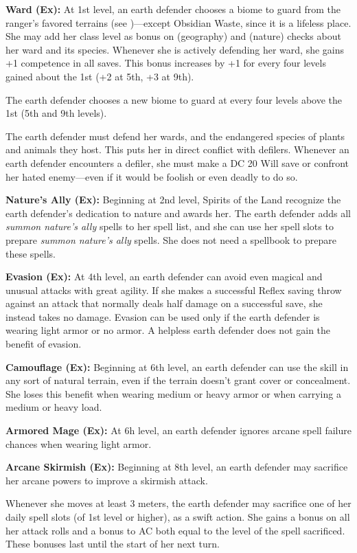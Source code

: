 {\textbf{Ward (Ex):} At 1st level, an earth defender chooses a biome to guard from the ranger's favored terrains (see )---except Obsidian Waste, since it is a lifeless place. She may add her class level as bonus on  (geography) and  (nature) checks about her ward and its species. Whenever she is actively defending her ward, she gains +1 competence in all saves. This bonus increases by +1 for every four levels gained about the 1st (+2 at 5th, +3 at 9th).

The earth defender chooses a new biome to guard at every four levels above the 1st (5th and 9th levels).

The earth defender must defend her wards, and the endangered species of plants and animals they host. This puts her in direct conflict with defilers. Whenever an earth defender encounters a defiler, she must make a DC 20 Will save or confront her hated enemy---even if it would be foolish or even deadly to do so.

\textbf{Nature's Ally (Ex):} Beginning at 2nd level, Spirits of the Land recognize the earth defender's dedication to nature and awards her. The earth defender adds all \emph{summon nature's ally} spells to her spell list, and she can use her spell slots to prepare \emph{summon nature's ally} spells. She does not need a spellbook to prepare these spells.

\textbf{Evasion (Ex):} At 4th level, an earth defender can avoid even magical and unusual attacks with great agility. If she makes a successful Reflex saving throw against an attack that normally deals half damage on a successful save, she instead takes no damage. Evasion can be used only if the earth defender is wearing light armor or no armor. A helpless earth defender does not gain the benefit of evasion.

\textbf{Camouflage (Ex):} Beginning at 6th level, an earth defender can use the  skill in any sort of natural terrain, even if the terrain doesn't grant cover or concealment. She loses this benefit when wearing medium or heavy armor or when carrying a medium or heavy load.

\textbf{Armored Mage (Ex):} At 6h level, an earth defender ignores arcane spell failure chances when wearing light armor.

\textbf{Arcane Skirmish (Ex):} Beginning at 8th level, an earth defender may sacrifice her arcane powers to improve a skirmish attack.

Whenever she moves at least 3 meters, the earth defender may sacrifice one of her daily spell slots (of 1st level or higher), as a swift action. She gains a bonus on all her attack rolls and a bonus to AC both equal to the level of the spell sacrificed. These bonuses last until the start of her next turn.

}
